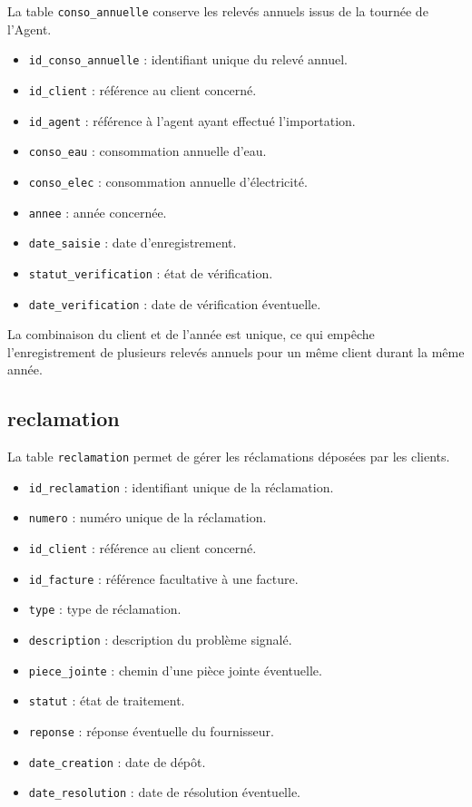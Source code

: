 La table \texttt{conso\_annuelle} conserve les relevés annuels issus de la tournée de l'Agent.

\begin{itemize}[leftmargin=*]
    \item \texttt{id\_conso\_annuelle} : identifiant unique du relevé annuel.
    \item \texttt{id\_client} : référence au client concerné.
    \item \texttt{id\_agent} : référence à l'agent ayant effectué l'importation.
    \item \texttt{conso\_eau} : consommation annuelle d'eau.
    \item \texttt{conso\_elec} : consommation annuelle d'électricité.
    \item \texttt{annee} : année concernée.
    \item \texttt{date\_saisie} : date d'enregistrement.
    \item \texttt{statut\_verification} : état de vérification.
    \item \texttt{date\_verification} : date de vérification éventuelle.
\end{itemize}

La combinaison du client et de l'année est unique, ce qui empêche l'enregistrement de plusieurs relevés annuels pour un même client durant la même année.

\subsection{reclamation}

La table \texttt{reclamation} permet de gérer les réclamations déposées par les clients.

\begin{itemize}[leftmargin=*]
    \item \texttt{id\_reclamation} : identifiant unique de la réclamation.
    \item \texttt{numero} : numéro unique de la réclamation.
    \item \texttt{id\_client} : référence au client concerné.
    \item \texttt{id\_facture} : référence facultative à une facture.
    \item \texttt{type} : type de réclamation.
    \item \texttt{description} : description du problème signalé.
    \item \texttt{piece\_jointe} : chemin d'une pièce jointe éventuelle.
    \item \texttt{statut} : état de traitement.
    \item \texttt{reponse} : réponse éventuelle du fournisseur.
    \item \texttt{date\_creation} : date de dépôt.
    \item \texttt{date\_resolution} : date de résolution éventuelle.
\end{itemize}

